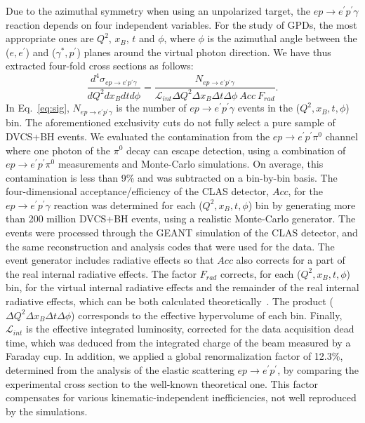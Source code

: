 \documentclass[nofootinbib,twocolumn,showpacs,prl,superscriptaddress,secnumarabic,amssymb,nobibnotes,aps,floatfix]{revtex4-1}
\begin{document}
Due to the azimuthal symmetry when using an unpolarized target,
the $ep\to e^\prime p^\prime \gamma$ reaction depends on four independent variables.
For the study of GPDs, the most appropriate ones are $Q^2$, $x_B$, $t$ and
$\phi$, where $\phi$ is the azimuthal angle between the ($e,e^\prime$) 
and ($\gamma^*,p^\prime$) planes around the virtual photon direction.
We have thus extracted four-fold cross sections as follows:
\begin{equation}
\frac{d^4 \sigma_{ep \rightarrow e^\prime p^\prime \gamma}}{dQ^2 dx_B dt d\phi} =
\frac{N_{ep\to e^\prime p^\prime \gamma}}{\mathcal{L}_{int} \Delta Q^2 \Delta x_B \Delta t \Delta \phi
\ Acc \ F_{rad}}.
\label{eq:sig}
\end{equation}
In Eq.~\ref{eq:sig}, 
$N_{ep\to e^\prime p^\prime \gamma}$ is the number of $ep\to e^\prime p^\prime \gamma$ events in the
($Q^2,x_B,t,\phi$) bin. The aforementioned exclusivity cuts do not fully select a pure
sample of DVCS+BH events. We evaluated the contamination from the $ep\to e^\prime p^\prime \pi^0$
channel where one photon of the $\pi^0$ decay can escape detection, using a combination of
$ep\to e^\prime p^\prime \pi^0$ measurements and Monte-Carlo simulations.
On average, this contamination is less than 9\% and was subtracted on a bin-by-bin basis.
The four-dimensional acceptance/efficiency of the CLAS detector, $Acc$, for the
$ep\to e^\prime p^\prime \gamma$ reaction
was determined for each ($Q^2,x_B,t,\phi$) bin by generating more than 200 million
DVCS+BH events, using a realistic Monte-Carlo generator. The events were processed through 
the GEANT simulation of the CLAS detector, and the same reconstruction
and analysis codes that were used for the data.
The event generator includes radiative effects so that $Acc$
also corrects for a part of the real internal radiative effects.
The factor $F_{rad}$ corrects, for each ($Q^2,x_B,t,\phi$) bin, for the virtual internal
radiative effects and the remainder of the real internal radiative effects, which can be both
calculated theoretically~\cite{Akushevich:2012tw}.
The product ($\Delta Q^2 \Delta x_B \Delta t \Delta \phi$) corresponds to the effective
hypervolume of each bin.
Finally, $\mathcal{L}_{int}$ is the effective integrated luminosity, corrected for the data
acquisition dead time, which was deduced from the integrated charge of the beam measured by a
Faraday cup. In addition, we applied a global renormalization factor of 12.3\%, determined
from the analysis of the elastic scattering $ep\to e^\prime p^\prime$, by comparing the
experimental cross section to the well-known theoretical one. This factor compensates for
various kinematic-independent inefficiencies, not well reproduced by the simulations.
\end{document}
